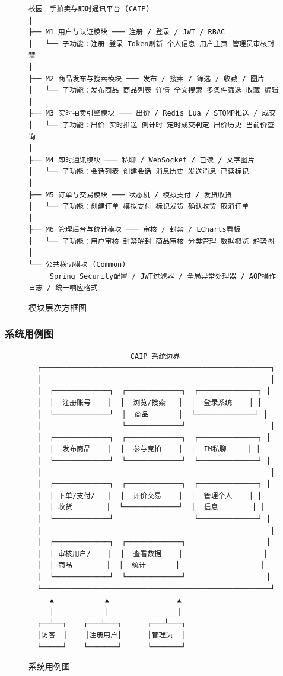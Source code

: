 \documentclass[12pt,a4paper]{ctexart}
\numberwithin{figure}{section}
\numberwithin{table}{section}
\begin{document}
\begin{figure}[H]
\centering
{\small
\begin{verbatim}
校园二手拍卖与即时通讯平台 (CAIP)
│
├── M1 用户与认证模块 ─── 注册 / 登录 / JWT / RBAC
│   └── 子功能：注册 登录 Token刷新 个人信息 用户主页 管理员审核封禁
│
├── M2 商品发布与搜索模块 ─── 发布 / 搜索 / 筛选 / 收藏 / 图片
│   └── 子功能：发布商品 商品列表 详情 全文搜索 多条件筛选 收藏 编辑
│
├── M3 实时拍卖引擎模块 ─── 出价 / Redis Lua / STOMP推送 / 成交
│   └── 子功能：出价 实时推送 倒计时 定时成交判定 出价历史 当前价查询
│
├── M4 即时通讯模块 ─── 私聊 / WebSocket / 已读 / 文字图片
│   └── 子功能：会话列表 创建会话 消息历史 发送消息 已读标记
│
├── M5 订单与交易模块 ─── 状态机 / 模拟支付 / 发货收货
│   └── 子功能：创建订单 模拟支付 标记发货 确认收货 取消订单
│
├── M6 管理后台与统计模块 ─── 审核 / 封禁 / ECharts看板
│   └── 子功能：用户审核 封禁解封 商品审核 分类管理 数据概览 趋势图
│
└── 公共横切模块 (Common)
     Spring Security配置 / JWT过滤器 / 全局异常处理器 / AOP操作日志 / 统一响应格式
\end{verbatim}
}
\caption{模块层次方框图}
\label{fig:module-hierarchy}
\end{figure}

\subsubsection{系统用例图}

\begin{figure}[H]
\centering
{\small
\begin{verbatim}
                        CAIP 系统边界
  ┌──────────────────────────────────────────────────────┐
  │                                                      │
  │  ┌─────────────┐  ┌─────────────┐  ┌──────────────┐ │
  │  │  注册账号    │  │  浏览/搜索   │  │  登录系统    │ │
  │  └─────────────┘  │  商品       │  └──────────────┘ │
  │                   └─────────────┘                    │
  │  ┌─────────────┐  ┌─────────────┐  ┌──────────────┐ │
  │  │  发布商品    │  │  参与竞拍    │  │  IM私聊     │ │
  │  └─────────────┘  └─────────────┘  └──────────────┘ │
  │                                                      │
  │  ┌─────────────┐  ┌─────────────┐  ┌──────────────┐ │
  │  │ 下单/支付/   │  │  评价交易    │  │  管理个人    │ │
  │  │ 收货        │  └─────────────┘  │  信息        │ │
  │  └─────────────┘                   └──────────────┘ │
  │                                                      │
  │  ┌─────────────┐  ┌─────────────┐                   │
  │  │ 审核用户/    │  │  查看数据    │                   │
  │  │ 商品        │  │  统计       │                   │
  │  └─────────────┘  └─────────────┘                   │
  └──────────────────────────────────────────────────────┘
     ▲            ▲                ▲
     │            │                │
  ┌──┴──┐    ┌───┴───┐      ┌───┴───┐
  │访客  │    │注册用户│      │管理员  │
  └─────┘    └───────┘      └───────┘
\end{verbatim}
}
\caption{系统用例图}
\label{fig:use-case}
\end{figure}
\end{document}
